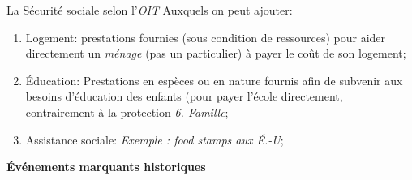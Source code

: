 \documentclass[10pt, french]{article}
\begin{document}
\begin{multicols*}{3}
\begin{conceptgen}{La Sécurité sociale selon l'\textit{OIT}}
Auxquels on peut ajouter:
\begin{enumerate}[leftmargin = *]
	\item	Logement: prestations fournies (sous condition de ressources) pour aider directement un \textit{ménage} (pas un particulier) à payer le coût de son logement;
	\item	Éducation: Prestations en espèces ou en nature fournis afin de subvenir aux besoins d'éducation des enfants (pour payer l'école directement, contrairement à la protection \textit{6. Famille};
	\item	Assistance sociale: \textit{Exemple : \og food stamps \fg{} aux É.-U};
\end{enumerate}
\end{conceptgen}

\textbf{Événements marquants historiques}


\end{multicols*}
\end{document}
